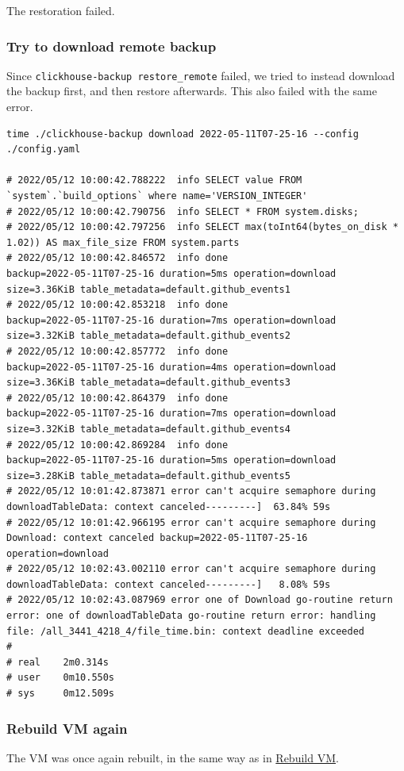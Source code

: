 The restoration failed.
\subsubsection{Try to download remote backup}
\label{sec:org8b2d881}
Since \texttt{clickhouse-backup restore\_remote} failed,
we tried to instead download the backup first, and then restore afterwards.
This also failed with the same error.

\begin{verbatim}
time ./clickhouse-backup download 2022-05-11T07-25-16 --config ./config.yaml

# 2022/05/12 10:00:42.788222  info SELECT value FROM `system`.`build_options` where name='VERSION_INTEGER'
# 2022/05/12 10:00:42.790756  info SELECT * FROM system.disks;
# 2022/05/12 10:00:42.797256  info SELECT max(toInt64(bytes_on_disk * 1.02)) AS max_file_size FROM system.parts
# 2022/05/12 10:00:42.846572  info done                      backup=2022-05-11T07-25-16 duration=5ms operation=download size=3.36KiB table_metadata=default.github_events1
# 2022/05/12 10:00:42.853218  info done                      backup=2022-05-11T07-25-16 duration=7ms operation=download size=3.32KiB table_metadata=default.github_events2
# 2022/05/12 10:00:42.857772  info done                      backup=2022-05-11T07-25-16 duration=4ms operation=download size=3.36KiB table_metadata=default.github_events3
# 2022/05/12 10:00:42.864379  info done                      backup=2022-05-11T07-25-16 duration=7ms operation=download size=3.32KiB table_metadata=default.github_events4
# 2022/05/12 10:00:42.869284  info done                      backup=2022-05-11T07-25-16 duration=5ms operation=download size=3.28KiB table_metadata=default.github_events5
# 2022/05/12 10:01:42.873871 error can't acquire semaphore during downloadTableData: context canceled---------]  63.84% 59s
# 2022/05/12 10:01:42.966195 error can't acquire semaphore during Download: context canceled backup=2022-05-11T07-25-16 operation=download
# 2022/05/12 10:02:43.002110 error can't acquire semaphore during downloadTableData: context canceled---------]   8.08% 59s
# 2022/05/12 10:02:43.087969 error one of Download go-routine return error: one of downloadTableData go-routine return error: handling file: /all_3441_4218_4/file_time.bin: context deadline exceeded
#
# real    2m0.314s
# user    0m10.550s
# sys     0m12.509s
\end{verbatim}
\subsubsection{Rebuild VM again}
\label{sec:org56a63e8}
The VM was once again rebuilt,
in the same way as in \hyperref[sec:org0452162]{Rebuild VM}.
